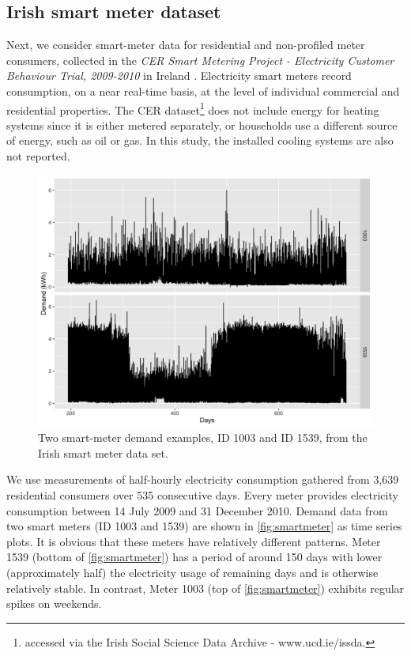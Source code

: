 \documentclass{article}
\begin{document}
\hypertarget{irish-smart-meter-dataset}{%
\subsection{Irish smart meter dataset}\label{irish-smart-meter-dataset}}

Next, we consider smart-meter data for residential and non-profiled
meter consumers, collected in the \emph{CER Smart Metering Project -
Electricity Customer Behaviour Trial, 2009-2010} in Ireland
\citep{cer2012-data}. Electricity smart meters record consumption, on a
near real-time basis, at the level of individual commercial and
residential properties. The CER dataset\footnote{accessed via the Irish
  Social Science Data Archive - www.ucd.ie/issda.} does not include
energy for heating systems since it is either metered separately, or
households use a different source of energy, such as oil or gas. In this
study, the installed cooling systems are also not reported.

\begin{figure}

{\centering \includegraphics[width=0.8\linewidth]{figures/smartmeter} 

}

\caption{Two smart-meter demand examples, ID 1003 and ID 1539, from the Irish smart meter data set.}\label{fig:smartmeter}
\end{figure}

We use measurements of half-hourly electricity consumption gathered from
3,639 residential consumers over 535 consecutive days. Every meter
provides electricity consumption between 14 July 2009 and 31 December
2010. Demand data from two smart meters (ID 1003 and 1539) are shown in
\autoref{fig:smartmeter} as time series plots. It is obvious that these
meters have relatively different patterns. Meter 1539 (bottom of
\autoref{fig:smartmeter}) has a period of around 150 days with lower
(approximately half) the electricity usage of remaining days and is
otherwise relatively stable. In contrast, Meter 1003 (top of
\autoref{fig:smartmeter}) exhibits regular spikes on weekends.
\end{document}
